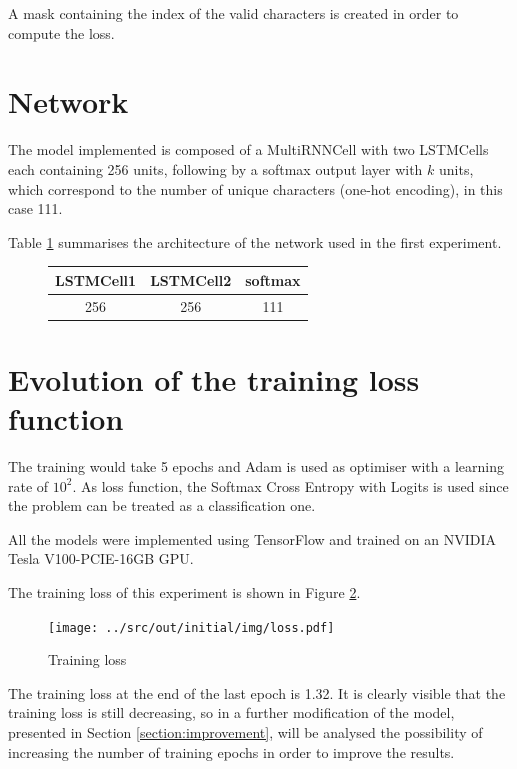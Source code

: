 \documentclass[a4paper,12pt]{article} %
\begin{document}
	A mask containing the index of the valid characters is created in order to 
	compute the loss.
	
	\section{Network}
	\label{section:network}
	
	The model implemented is composed of a MultiRNNCell with two LSTMCells each 
	containing 256 units, following by a softmax output layer with $k$ units, 
	which correspond to the number of unique characters (one-hot encoding), in 
	this case 111.
	
	Table \ref{tab:model0} summarises the architecture of the network used in 
	the first experiment.	
	\begin{figure}[htb]
		\centering
		
		\begin{tabular}{ccc}
			\toprule
			\textbf{LSTMCell1} & \textbf{LSTMCell2} & \textbf{softmax} \\
			\midrule
			256 & 256 & 111\\
			\bottomrule
		\end{tabular}
		\label{tab:model0}
	\end{figure}

	\section{Evolution of the training loss function}
	\label{section:loss}

	The training would take 5 epochs and Adam is used as optimiser with a 
	learning rate of $10^2$. As loss function, the Softmax Cross Entropy with 
	Logits is used since the problem can be treated as a classification one.
	
	All the models were implemented using TensorFlow and trained on an NVIDIA 
	Tesla V100-PCIE-16GB GPU.
	
	The training loss of this experiment is shown in Figure 
	\ref{fig:model0-loss}.
	
	\begin{figure}[htb]
		\centering
		\texttt{[image: ../src/out/initial/img/loss.pdf]}	
		\caption{Training loss}
		\label{fig:model0-loss}
	\end{figure}

	The training loss at the end of the last epoch is 1.32.
	It is clearly visible that the training loss is still decreasing, so in a
	further modification of the model, presented in Section 
	\ref{section:improvement}, will be analysed the possibility of 
	increasing the number of training epochs in order to improve the results.
\end{document}
